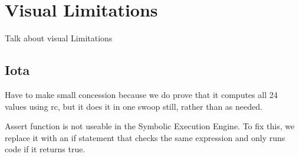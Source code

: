 \section{Visual Limitations}\label{sec:visual}
Talk about visual Limitations
\subsection{Iota}
Have to make small concession because we do prove that it computes all 24 values using rc, but it does it in one swoop still, rather than as needed.

Assert function is not useable in the Symbolic Execution Engine.
To fix this, we replace it with an if statement that checks the same expression and only runs code if it returns true.
